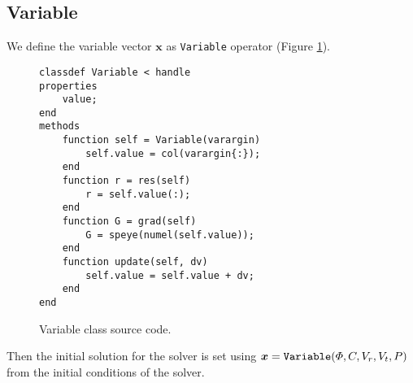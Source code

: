 \documentclass[MSc,beforeExam]{iitcsthesis}
\newcommand\bx{\boldsymbol{x}}
\begin{document}
\subsection{Variable}
We define the variable vector $\bx$ as \verb|Variable| 
operator (Figure \ref{fig:variable.m}).

\begin{figure}[htpb]
\begin{lstlisting}
classdef Variable < handle
properties
    value;
end
methods
    function self = Variable(varargin)
        self.value = col(varargin{:});
    end
    function r = res(self)
        r = self.value(:);
    end
    function G = grad(self) 
        G = speye(numel(self.value));
    end
    function update(self, dv)
        self.value = self.value + dv;
    end
end
\end{lstlisting}
\caption{Variable class source code.} \label{fig:variable.m}
\end{figure}
Then the initial solution for the solver is set using
$\bx = \verb|Variable|(\varPhi, C, V_r, V_t, P)$
from the initial conditions of the solver.
\end{document}
